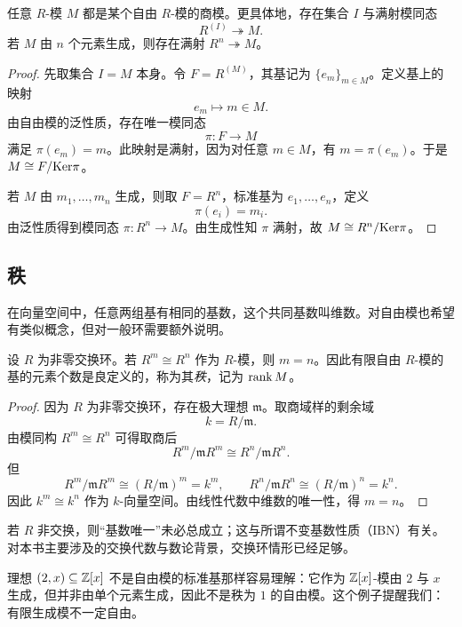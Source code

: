 \begin{theorem}
任意 $R$-模 $M$ 都是某个自由 $R$-模的商模。更具体地，存在集合 $I$ 与满射模同态
\[
R^{(I)}\twoheadrightarrow M.
\]
若 $M$ 由 $n$ 个元素生成，则存在满射 $R^n\twoheadrightarrow M$。
\end{theorem}

\begin{proof}
先取集合 $I=M$ 本身。令 $F=R^{(M)}$，其基记为 $\{e_m\}_{m\in M}$。定义基上的映射
\[
e_m\longmapsto m\in M.
\]
由自由模的泛性质，存在唯一模同态
\[
\pi\colon F\to M
\]
满足 $\pi(e_m)=m$。此映射是满射，因为对任意 $m\in M$，有 $m=\pi(e_m)$。于是 $M\cong F/\mathrm{Ker}\pi$。

若 $M$ 由 $m_1,\dots,m_n$ 生成，则取 $F=R^n$，标准基为 $e_1,\dots,e_n$，定义
\[
\pi(e_i)=m_i.
\]
由泛性质得到模同态 $\pi\colon R^n\to M$。由生成性知 $\pi$ 满射，故 $M\cong R^n/\mathrm{Ker}\pi$。
\end{proof}

\subsection{秩}

在向量空间中，任意两组基有相同的基数，这个共同基数叫维数。对自由模也希望有类似概念，但对一般环需要额外说明。

\begin{theorem}[交换环上自由模的秩良定义]
设 $R$ 为非零交换环。若 $R^m\cong R^n$ 作为 $R$-模，则 $m=n$。因此有限自由 $R$-模的基的元素个数是良定义的，称为其\emph{秩}，记为 $\operatorname{rank} M$。
\end{theorem}

\begin{proof}
因为 $R$ 为非零交换环，存在极大理想 $\mathfrak m$。取商域样的剩余域
\[
k=R/\mathfrak m.
\]
由模同构 $R^m\cong R^n$ 可得取商后
\[
R^m/\mathfrak m R^m\cong R^n/\mathfrak m R^n.
\]
但
\[
R^m/\mathfrak m R^m\cong (R/\mathfrak m)^m=k^m,
\qquad
R^n/\mathfrak m R^n\cong (R/\mathfrak m)^n=k^n.
\]
因此 $k^m\cong k^n$ 作为 $k$-向量空间。由线性代数中维数的唯一性，得 $m=n$。
\end{proof}

\begin{remark}
若 $R$ 非交换，则“基数唯一”未必总成立；这与所谓不变基数性质（IBN）有关。对本书主要涉及的交换代数与数论背景，交换环情形已经足够。
\end{remark}

\begin{example}
理想 $(2,x)\subseteq \mathbb{Z}[x]$ 不是自由模的标准基那样容易理解：它作为 $\mathbb{Z}[x]$-模由 $2$ 与 $x$ 生成，但并非由单个元素生成，因此不是秩为 $1$ 的自由模。这个例子提醒我们：有限生成模不一定自由。
\end{example}

